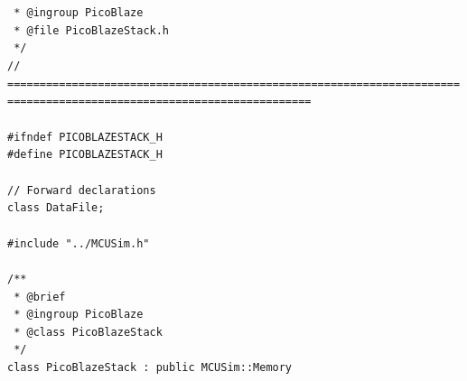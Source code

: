 \documentclass[a4paper,twoside,15pt]{book}
\begin{document}
{            \verb' '{\color{highlight_c_dox_comment}\verb'*'}\verb' '{\color{highlight_c_dox_tag}\verb'@ingroup'}{\color{highlight_c_dox_name}\verb' PicoBlaze'}\\
            \verb' '{\color{highlight_c_dox_comment}\verb'*'}\verb' '{\color{highlight_c_dox_tag}\verb'@file'}\verb' '{\color{highlight_c_dox_word}\verb'PicoBlazeStack.h'}\\
            \verb' '{\color{highlight_c_dox_comment}\verb'*/'}\\
            {\color{highlight_c_comment}\verb'// ====================================================================================================================='}\\
            \verb''\\
            {\color{highlight_c_directive}\verb'#ifndef'}{\color{highlight_c_preprocessor}\verb' PICOBLAZESTACK_H'}\\
            {\color{highlight_c_directive}\verb'#define'}{\color{highlight_c_preprocessor}\verb' PICOBLAZESTACK_H'}\\
            \verb''\\
            {\color{highlight_c_comment}\verb'// Forward declarations'}\\
            {\color{highlight_normal}\verb'class DataFile'{\color{highlight_c_symbol}\verb';'}}\\
            \verb''\\
            {\color{highlight_c_directive}\verb'#include'}{\color{highlight_c_prep_lib}\verb' "../MCUSim.h"'}\\
            \verb''\\
            {\color{highlight_c_dox_comment}\verb'/**'}\\
            \verb' '{\color{highlight_c_dox_comment}\verb'*'}\verb' '{\color{highlight_c_dox_tag}\verb'@brief'}\\
            \verb' '{\color{highlight_c_dox_comment}\verb'*'}\verb' '{\color{highlight_c_dox_tag}\verb'@ingroup'}{\color{highlight_c_dox_name}\verb' PicoBlaze'}\\
            \verb' '{\color{highlight_c_dox_comment}\verb'*'}\verb' '{\color{highlight_c_dox_tag}\verb'@class'}\verb' '{\color{highlight_c_dox_comment}\verb'PicoBlazeStack'}\\
            \verb' '{\color{highlight_c_dox_comment}\verb'*/'}\\
            {\color{highlight_normal}\verb'class PicoBlazeStack '{\color{highlight_c_symbol}\verb':'}\verb' public MCUSim'{\color{highlight_c_symbol}\verb'::'}\verb'Memory'}\\
}
\end{document}
